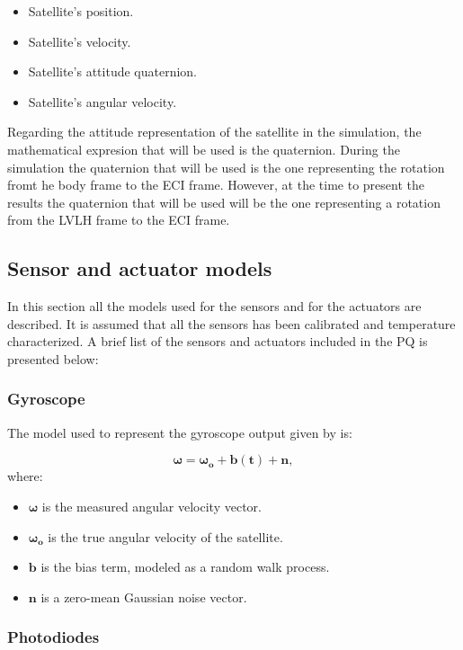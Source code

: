 \begin{itemize}
    \item Satellite's position.
    \item Satellite's velocity.
    \item Satellite's attitude quaternion.
    \item Satellite's angular velocity.
\end{itemize}

\noindent Regarding the attitude representation of the satellite in the simulation, the mathematical expresion that will be used is the quaternion. During the
simulation the quaternion that will be used is the one representing the rotation fromt he body frame to the ECI frame. However, at the time to 
present the results the quaternion that will be used will be the one representing a rotation from the LVLH frame to the ECI frame.

\subsection{Sensor and actuator models}
In this section all the models used for the sensors and for the actuators are described. It is assumed that all the sensors has been calibrated
and temperature characterized. A brief list of the sensors and actuators included in the PQ is presented below:

\sensorsactuators

\subsubsection{Gyroscope}
The model used to represent the gyroscope output given by \cite{Landis} is:

\begin{equation}
    \boldsymbol{\omega} = \boldsymbol{\omega_o} +\boldsymbol{b(t)}+\boldsymbol{n},
\end{equation}
where:
\begin{itemize}
    \item $\boldsymbol{\omega}$ is the measured angular velocity vector.
    \item $\boldsymbol{\omega_o}$ is the true angular velocity of the satellite.
    \item $\boldsymbol{b}$ is the bias term, modeled as a random walk process.
    \item $\boldsymbol{n}$ is a zero-mean Gaussian noise vector.
\end{itemize}
\subsubsection{Photodiodes}

